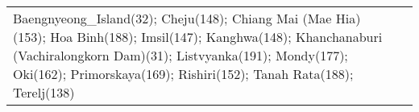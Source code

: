 \documentclass[journal abbreviation, manuscript]{copernicus}
\begin{document}
\begin{table}
\begin{tabularx}{\textwidth}{lX}
                                                                                                                                                                                                                                                                                                                                                                                                                                                                                                                                                                                                                                                                                                                                                                                                                                                                                                                                                                                                                                                                                                                                                                                                                                                                                                                                                                                                                                                                                                                                                                                                                                                                                                                                                                                                                                                                                                                                                 Baengnyeong\_Island(32); Cheju(148); Chiang Mai (Mae Hia)(153); Hoa Binh(188); Imsil(147); Kanghwa(148); Khanchanaburi (Vachiralongkorn Dam)(31); Listvyanka(191); Mondy(177); Oki(162); Primorskaya(169); Rishiri(152); Tanah Rata(188); Terelj(138) \\

\end{tabularx}
\end{table}
\end{document}
